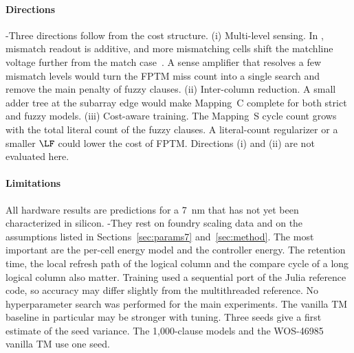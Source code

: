 \paragraph{Directions}
\hyp{Three directions follow from the cost structure.
(i) Multi-level sensing. In \gainp{}, mismatch readout is additive, and more mismatching cells shift the matchline voltage further from the match case~\cite{levi2026gainp}. A sense amplifier that resolves a few mismatch levels would turn the FPTM miss count into a single search and remove the main penalty of fuzzy clauses.
(ii) Inter-column reduction. A small adder tree at the subarray edge would make Mapping~C complete for both strict and fuzzy models.
(iii) Cost-aware training. The Mapping~S cycle count grows with the total literal count of the fuzzy clauses. A literal-count regularizer or a smaller $\LF$ could lower the \gainp{} cost of FPTM.}
Directions (i) and (ii) are not evaluated here. 

\paragraph{Limitations}
All hardware results are predictions for a 7~nm \gainp{} that has not yet been characterized in silicon.
\hyp{They rest on foundry scaling data and on the assumptions listed in Sections~\ref{sec:params7} and~\ref{sec:method}. The most important are the per-cell energy model and the controller energy. The retention time, the local refresh path of the logical column and the compare cycle of a long logical column also matter.}
Training used a sequential port of the Julia reference code, so accuracy may differ slightly from the multithreaded reference.
No hyperparameter search was performed for the main experiments.  The vanilla TM baseline in particular may be stronger with tuning.
Three seeds give a first estimate of the seed variance. The 1,000-clause models and the WOS-46985 vanilla TM use one seed.
